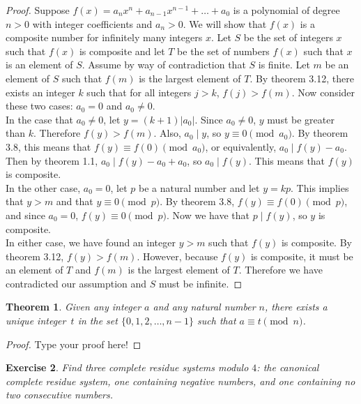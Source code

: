 \documentclass[12pt,leqno]{article}
\numberwithin{equation}{section}
\newtheorem{thm}{Theorem}[section]
\newtheorem{exer}[thm]{Exercise}
\theoremstyle{definition}
\newcommand{\card}[1]{\left| #1 \right|}
\begin{document}
\begin{proof}[Proof]
Suppose $f(x) = a_nx^n + a_{n-1}x^{n-1} + \hdots + a_0$ is a polynomial of degree $n > 0$ with integer coefficients and $a_n > 0$.  We will show that $f(x)$ is a composite number for infinitely many integers $x$.  Let $S$ be the set of integers $x$ such that $f(x)$ is composite and let $T$ be the set of numbers $f(x)$ such that $x$ is an element of $S$.  Assume by way of contradiction that $S$ is finite.  Let $m$ be an element of $S$ such that $f(m)$ is the largest element of $T$.  By theorem 3.12, there exists an integer $k$ such that for all integers $j > k$, $f(j) > f(m)$.  Now consider these two cases: $a_0 = 0$ and $a_0 \neq 0$.\\
In the case that $a_0 \neq 0$, let $y = (k+1)\card{a_0}$.  Since $a_0 \neq 0$, $y$ must be greater than $k$.  Therefore $f(y) > f(m)$.  Also, $a_0 \mid y$, so $y \equiv 0 \pmod{a_0}$.  By theorem 3.8, this means that $f(y) \equiv f(0) \pmod{a_0}$, or equivalently, $a_0 \mid f(y) - a_0$.  Then by theorem 1.1, $a_0 \mid f(y) - a_0 + a_0$, so $a_0 \mid f(y)$.  This means that $f(y)$ is composite.\\
In the other case, $a_0 = 0$, let $p$ be a natural number and let $y = kp$.  This implies that $y > m$ and that $y \equiv 0 \pmod{p}$.  By theorem 3.8, $f(y) \equiv f(0) \pmod{p}$, and since $a_0 = 0$, $f(y) \equiv 0 \pmod{p}$.  Now we have that $p \mid f(y)$, so $y$ is composite.\\
In either case, we have found an integer $y > m$ such that $f(y)$ is composite.  By theorem 3.12, $f(y) > f(m)$.  However, because $f(y)$ is composite, it must be an element of $T$ and $f(m)$ is the largest element of $T$.  Therefore we have contradicted our assumption and $S$ must be infinite.
\end{proof}

\begin{thm}Given any integer $a$ and any natural number $n$, there exists a unique integer~$t$ in the set $\{0, 1, 2, \hdots, n - 1\}$ such that $a \equiv t \pmod{n}$.
\end{thm}

\begin{proof}[Proof]
Type your proof here!
\end{proof}



\begin{exer}
Find three complete residue systems modulo $4$: the canonical
complete residue system, one containing negative numbers, and one
containing no two consecutive numbers.
\end{exer}
\end{document}
